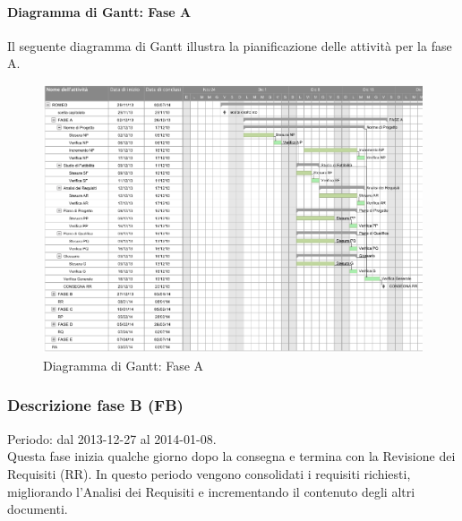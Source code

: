 \paragraph{Diagramma di Gantt: Fase A }
\label{DiagrammaAnalisi}
Il seguente diagramma di Gantt\g{} illustra la pianificazione delle attività per la fase A.
\begin{figure}[!h]
	\centering
	\includegraphics[width=1.2\textwidth]{./content/Immagini/faseA.png}
	\caption{Diagramma di Gantt: Fase A}
	\label{DiagrammaAnalisiGantt}
\end{figure} 
\pagebreak
\subsubsection{Descrizione fase B (FB)}
\label{Analisi Incrementale (FAI)}
Periodo: dal 2013-12-27 al 2014-01-08. \\
Questa fase inizia qualche giorno dopo la consegna e termina con la Revisione dei Requisiti (RR). In questo periodo vengono consolidati i requisiti richiesti, migliorando l’Analisi dei Requisiti e incrementando il contenuto degli altri documenti.
